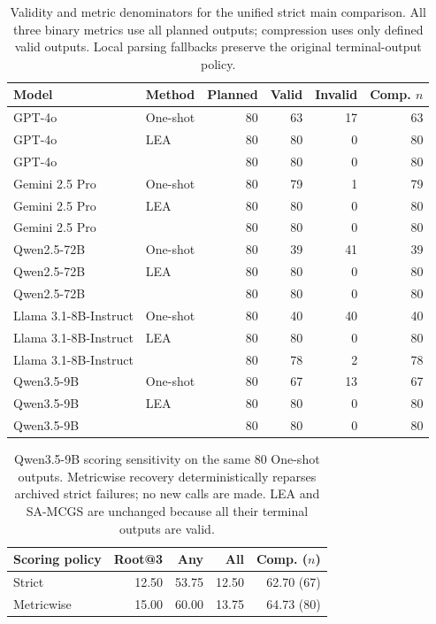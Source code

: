 \begin{revadded}
\begin{table}[t]
\centering\small
\begin{tabular}{llrrrr}
\toprule
Model & Method & Planned & Valid & Invalid & Comp. $n$ \\
\midrule
GPT-4o & One-shot & 80 & 63 & 17 & 63 \\
GPT-4o & LEA & 80 & 80 & 0 & 80 \\
GPT-4o & \samcgs{} & 80 & 80 & 0 & 80 \\
Gemini 2.5 Pro & One-shot & 80 & 79 & 1 & 79 \\
Gemini 2.5 Pro & LEA & 80 & 80 & 0 & 80 \\
Gemini 2.5 Pro & \samcgs{} & 80 & 80 & 0 & 80 \\
Qwen2.5-72B & One-shot & 80 & 39 & 41 & 39 \\
Qwen2.5-72B & LEA & 80 & 80 & 0 & 80 \\
Qwen2.5-72B & \samcgs{} & 80 & 80 & 0 & 80 \\
Llama 3.1-8B-Instruct & One-shot & 80 & 40 & 40 & 40 \\
Llama 3.1-8B-Instruct & LEA & 80 & 80 & 0 & 80 \\
Llama 3.1-8B-Instruct & \samcgs{} & 80 & 78 & 2 & 78 \\
Qwen3.5-9B & One-shot & 80 & 67 & 13 & 67 \\
Qwen3.5-9B & LEA & 80 & 80 & 0 & 80 \\
Qwen3.5-9B & \samcgs{} & 80 & 80 & 0 & 80 \\
\bottomrule\end{tabular}
\caption{Validity and metric denominators for the unified strict main comparison. All three binary metrics use all planned outputs; compression uses only defined valid outputs. Local parsing fallbacks preserve the original terminal-output policy.}
\label{tab:unified_scoring_denominators}
\end{table}

\begin{table}[t]
\centering\small
\setlength{\tabcolsep}{4pt}
\begin{tabular}{lrrrr}
\toprule
Scoring policy & Root@3 & Any & All & Comp. ($n$) \\
\midrule
Strict & 12.50 & 53.75 & 12.50 & 62.70 (67) \\
Metricwise & 15.00 & 60.00 & 13.75 & 64.73 (80) \\
\bottomrule\end{tabular}
\caption{Qwen3.5-9B scoring sensitivity on the same 80 One-shot outputs. Metricwise recovery deterministically reparses archived strict failures; no new calls are made. LEA and SA-MCGS are unchanged because all their terminal outputs are valid.}
\label{tab:qwen_scoring_sensitivity}
\end{table}


\end{revadded}
